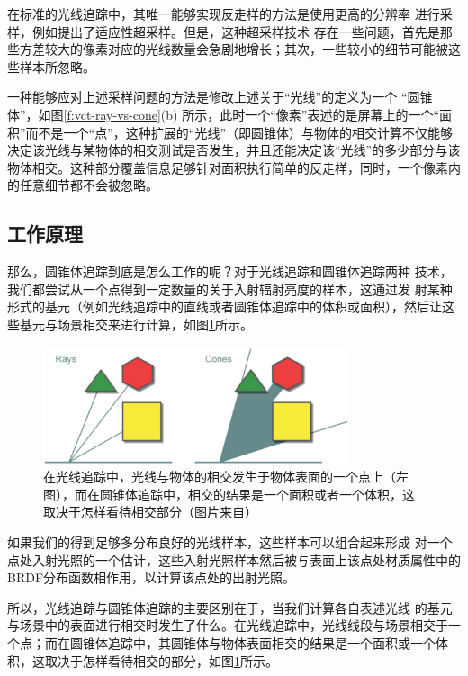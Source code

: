 在标准的光线追踪中，其唯一能够实现反走样的方法是使用更高的分辨率 进行采样，例如\cite{a:ray-tracing}提出了适应性超采样。但是，这种超采样技术 存在一些问题，首先是那些方差较大的像素对应的光线数量会急剧地增长；其次，一些较小的细节可能被这些样本所忽略。

一种能够应对上述采样问题的方法是修改上述关于“光线”的定义为一个 “圆锥体”，如图\ref{f:vct-ray-vs-cone}(b) 所示，此时一个“像素”表述的是屏幕上的一个“面积”而不是一个“点”，这种扩展的“光线”（即圆锥体）与物体的相交计算不仅能够决定该光线与某物体的相交测试是否发生，并且还能决定该“光线”的多少部分与该物体相交。这种部分覆盖信息足够针对面积执行简单的反走样，同时，一个像素内的任意细节都不会被忽略。



\subsection{工作原理}
那么，圆锥体追踪到底是怎么工作的呢？对于光线追踪和圆锥体追踪两种 技术，我们都尝试从一个点得到一定数量的关于入射辐射亮度的样本，这通过发 射某种形式的基元（例如光线追踪中的直线或者圆锥体追踪中的体积或面积），然后让这些基元与场景相交来进行计算，如图\ref{f:vct-2-1}所示。

\begin{figure}
\begin{center}
	\includegraphics[width=0.8\textwidth]{figures/vct/vct-2-1}
	\end{center}
	\caption{在光线追踪中，光线与物体的相交发生于物体表面的一个点上（左图），而在圆锥体追踪中，相交的结果是一个面积或者一个体积，这取决于怎样看待相交部分（图片来自\cite{a:TheTechnologyofTheTomorrowChildren}）}
	\label{f:vct-2-1}
\end{figure}

如果我们的得到足够多分布良好的光线样本，这些样本可以组合起来形成 对一个点处入射光照的一个估计，这些入射光照样本然后被与表面上该点处材质属性中的BRDF分布函数相作用，以计算该点处的出射光照。

所以，光线追踪与圆锥体追踪的主要区别在于，当我们计算各自表述光线 的基元与场景中的表面进行相交时发生了什么。在光线追踪中，光线线段与场景相交于一个点；而在圆锥体追踪中，其圆锥体与物体表面相交的结果是一个面积或一个体积，这取决于怎样看待相交的部分，如图\ref{f:vct-2-1}所示。

